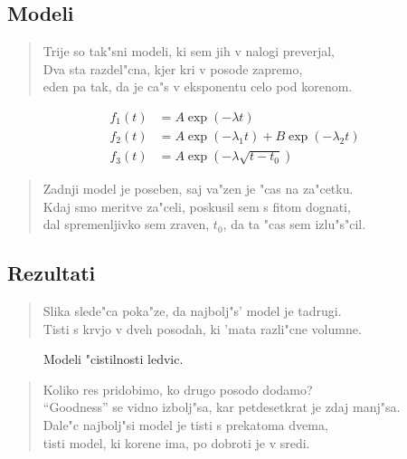 \documentclass[a4paper,10pt]{article}
\begin{document}
\subsection{Modeli}
\begin{verse}
 Trije so tak"sni modeli, ki sem jih v nalogi preverjal, \\
 Dva sta razdel"cna, kjer kri v posode zapremo, \\
 eden pa tak, da je ca"s v eksponentu celo pod korenom. 
\end{verse}

\begin{align}
 f_1(t) &= A \exp(-\lambda t) \\
 f_2(t) &= A \exp(-\lambda_1 t) + B \exp(-\lambda_2 t) \\
 f_3(t) &= A \exp(-\lambda \sqrt{t-t_0})
\end{align}

\begin{verse}
 Zadnji model je poseben, saj va"zen je "cas na za"cetku. \\
 Kdaj smo meritve za"celi, poskusil sem s fitom dognati, \\
 dal spremenljivko sem zraven, $t_0$, da ta "cas sem izlu"s"cil. 
\end{verse}

\subsection{Rezultati}

\begin{verse}
 Slika slede"ca poka"ze, da najbolj"s' model je tadrugi. \\
 Tisti s krvjo v dveh posodah, ki 'mata razli"cne volumne. \\
\end{verse}

\begin{figure}
 
  \caption{Modeli "cistilnosti ledvic. }
  \label{fig:ledvice}
\end{figure}

\begin{verse}
 Koliko res pridobimo, ko drugo posodo dodamo? \\
 ``Goodness'' se vidno izbolj"sa, kar petdesetkrat je zdaj manj"sa. \\
 Dale"c najbolj"si model je tisti s prekatoma dvema, \\
 tisti model, ki korene ima, po dobroti je v sredi. 
\end{verse}
\end{document}
